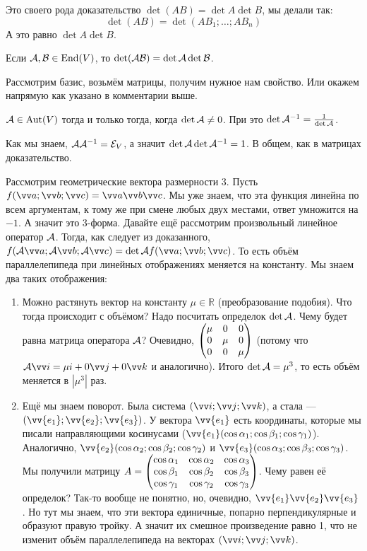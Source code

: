 \documentclass{article}
\let\vec\vv
\newcommand*{\id}{{\scriptE}}
\begin{document}
\begin{itemize}
        \begin{Comment}
            Это своего рода доказательство $\det(AB)=\det A\det B$, мы делали так:
            $$\det(AB)=\det(AB_1;\ldots;AB_n)$$
            А это равно $\det A\det B$.
        \end{Comment}
        \thm Если ${\mathcal{A}},{\mathcal{B}}\in\operatorname{End}(V)$, то $\det({\mathcal{A}}{\mathcal{B}})=\det{\mathcal{A}}\det{\mathcal{B}}$.
        \begin{Proof}
            Рассмотрим базис, возьмём матрицы, получим нужное нам свойство. Или окажем напрямую как указано в комментарии выше.
        \end{Proof}
        \thm ${\mathcal{A}}\in\operatorname{Aut}(V)$ тогда и только тогда, когда $\det{\mathcal{A}}\neq0$. При это $\det{\mathcal{A}}^{-1}=\frac1{\det{\mathcal{A}}}$.
        \begin{Proof}
            Как мы знаем, $\scriptA\scriptA^{-1}=\id_V$, а значит $\det{\mathcal{A}}\det{\mathcal{A}}^{-1}=1$. В общем, как в матрицах доказательство.
        \end{Proof}
        \begin{Example}
            Рассмотрим геометрические вектора размерности 3. Пусть $f(\vec a;\vec b;\vec c)=\vec a\vec b\vec c$. Мы уже знаем, что эта функция линейна по всем аргументам, к тому же при смене любых двух местами, ответ умножится на $-1$. А значит это 3-форма. Давайте ещё рассмотрим произвольный линейное оператор ${\mathcal{A}}$. Тогда, как следует из доказанного, $f(\scriptA\vec a;\scriptA\vec b;\scriptA\vec c)=\det\scriptA f(\vec a;\vec b;\vec c)$. То есть объём параллелепипеда при линейных отображениях меняется на константу. Мы знаем два таких отображения:
            \begin{enumerate}
                \item Можно растянуть вектор на константу $\mu\in\mathbb R$ (преобразование подобия). Что тогда происходит с объёмом? Надо посчитать определок $\det{\mathcal{A}}$. Чему будет равна матрица оператора ${\mathcal{A}}$? Очевидно, $\left(\begin{matrix}\mu & 0 & 0\\0 & \mu & 0\\0 & 0 & \mu\end{matrix}\right)$ (потому что $\scriptA\vec i=\mu i+0\vec j+0\vec k$ и аналогично). Итого $\det{\mathcal{A}}=\mu^3$, то есть объём меняется в $|\mu^3|$ раз.
                \item Ещё мы знаем поворот. Была система $(\vec i;\vec j;\vec k)$, а стала --- $(\vec{e_1};\vec{e_2};\vec{e_3})$. У вектора $\vec{e_1}$ есть координаты, которые мы писали направляющими косинусами ($\vec{e_1}(\cos\alpha_1;\cos\beta_1;\cos\gamma_1)$). Аналогично, $\vec{e_2}(\cos\alpha_2;\cos\beta_2;\cos\gamma_2)$ и $\vec{e_3}(\cos\alpha_3;\cos\beta_3;\cos\gamma_3)$. Мы получили матрицу $A=\left(\begin{matrix}\cos\alpha_1 & \cos\alpha_2 & \cos\alpha_3\\\cos\beta_1 & \cos\beta_2 & \cos\beta_3\\\cos\gamma_1 & \cos\gamma_2 & \cos\gamma_3\end{matrix}\right)$. Чему равен её определок? Так-то вообще не понятно, но, очевидно, $\vec{e_1}\vec{e_2}\vec{e_3}$. Но тут мы знаем, что эти вектора единичные, попарно перпендикулярные и образуют правую тройку. А значит их смешное произведение равно 1, что не изменит объём параллелепипеда на векторах $(\vec i;\vec j;\vec k)$.

\end{enumerate}
\end{Example}
\end{itemize}
\end{document}
